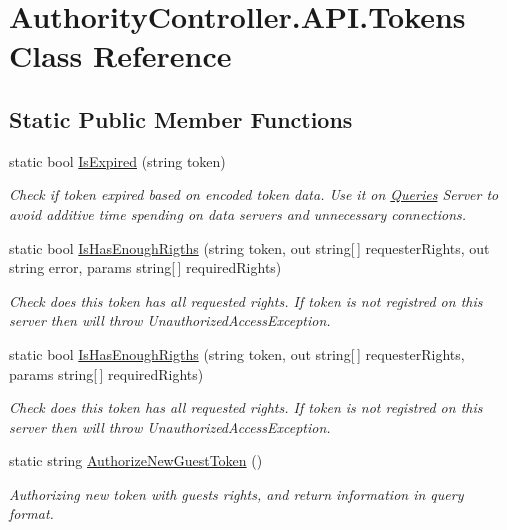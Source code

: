 \hypertarget{class_authority_controller_1_1_a_p_i_1_1_tokens}{}\section{Authority\+Controller.\+A\+P\+I.\+Tokens Class Reference}
\label{class_authority_controller_1_1_a_p_i_1_1_tokens}
\subsection*{Static Public Member Functions}
\begin{DoxyCompactItemize}
\item 
static bool \mbox{\hyperlink{class_authority_controller_1_1_a_p_i_1_1_tokens_acbc5a5df26ae29633d4424873676ece3}{Is\+Expired}} (string token)
\begin{DoxyCompactList}\small\item\em Check if token expired based on encoded token data. Use it on \mbox{\hyperlink{namespace_authority_controller_1_1_queries}{Queries}} Server to avoid additive time spending on data servers and unnecessary connections. \end{DoxyCompactList}\item 
static bool \mbox{\hyperlink{class_authority_controller_1_1_a_p_i_1_1_tokens_a3077a786044bdd530ad50dbd615f8beb}{Is\+Has\+Enough\+Rigths}} (string token, out string\mbox{[}$\,$\mbox{]} requester\+Rights, out string error, params string\mbox{[}$\,$\mbox{]} required\+Rights)
\begin{DoxyCompactList}\small\item\em Check does this token has all requested rights. If token is not registred on this server then will throw Unauthorized\+Access\+Exception. \end{DoxyCompactList}\item 
static bool \mbox{\hyperlink{class_authority_controller_1_1_a_p_i_1_1_tokens_ab1d580a971a86c8e5b3c7c189aa65381}{Is\+Has\+Enough\+Rigths}} (string token, out string\mbox{[}$\,$\mbox{]} requester\+Rights, params string\mbox{[}$\,$\mbox{]} required\+Rights)
\begin{DoxyCompactList}\small\item\em Check does this token has all requested rights. If token is not registred on this server then will throw Unauthorized\+Access\+Exception. \end{DoxyCompactList}\item 
static string \mbox{\hyperlink{class_authority_controller_1_1_a_p_i_1_1_tokens_a0ba1c2d69ffbc73d78b7b16735f7fb5a}{Authorize\+New\+Guest\+Token}} ()
\begin{DoxyCompactList}\small\item\em Authorizing new token with guest\textquotesingle{}s rights, and return information in query format. \end{DoxyCompactList}\end{DoxyCompactItemize}
